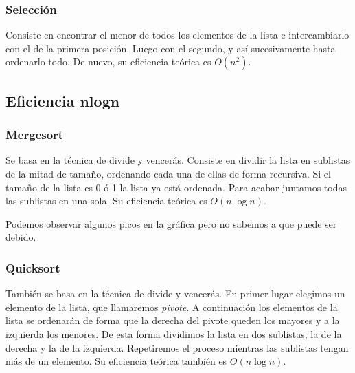 \documentclass[11pt]{article}
\begin{document}
\subsubsection*{Selección}
Consiste en encontrar el menor de todos los elementos de la lista e intercambiarlo con el de la primera posición. Luego con el segundo, y así sucesivamente hasta ordenarlo todo. De nuevo, su eficiencia teórica es $O(n^2)$.
\begin{center}
	
\end{center}

\subsection*{Eficiencia $\boldsymbol{n log n}$}
\subsubsection*{Mergesort}
Se basa en la técnica de divide y vencerás. Consiste en dividir la lista en sublistas de la mitad de tamaño, ordenando cada una de ellas de forma recursiva. Si el tamaño de la lista es 0 ó 1 la lista ya está ordenada. Para acabar juntamos todas las sublistas en una sola. Su eficiencia teórica es $O(n\log n)$.

\begin{center}
	
\end{center}

Podemos observar algunos picos en la gráfica pero no sabemos a que puede ser debido.

\subsubsection*{Quicksort}
También se basa en la técnica de divide y vencerás.
En primer lugar elegimos un elemento de la lista, que llamaremos \textit{pivote}. A continuación los elementos de la lista se ordenarán de forma que la derecha del pivote queden los mayores y a la izquierda los menores. De esta forma dividimos la lista en dos sublistas, la de la derecha y la de la izquierda. Repetiremos el proceso mientras las sublistas tengan más de un elemento. Su eficiencia teórica también es $O(n\log n)$.

\begin{center}
	
\end{center}
\end{document}
